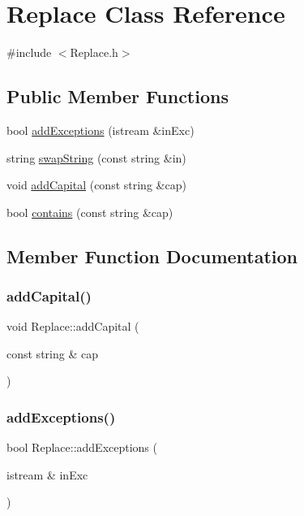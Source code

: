 \hypertarget{class_replace}{}\section{Replace Class Reference}
\label{class_replace}


{\ttfamily \#include $<$Replace.\+h$>$}

\subsection*{Public Member Functions}
\begin{DoxyCompactItemize}
\item 
bool \hyperlink{class_replace_a62e46b485d0fed42ad0b445673a75f84}{add\+Exceptions} (istream \&in\+Exc)
\item 
string \hyperlink{class_replace_a464d1037d9780790052685f2e30c58c0}{swap\+String} (const string \&in)
\item 
void \hyperlink{class_replace_a8ae8d231b3375eaaae29858da87319ec}{add\+Capital} (const string \&cap)
\item 
bool \hyperlink{class_replace_abcd8feb318330bd5eef71fcc287f31dc}{contains} (const string \&cap)
\end{DoxyCompactItemize}


\subsection{Member Function Documentation}
\mbox{\label{class_replace_a8ae8d231b3375eaaae29858da87319ec}} 
\subsubsection{\texorpdfstring{add\+Capital()}{addCapital()}}
{\footnotesize\ttfamily void Replace\+::add\+Capital (\begin{DoxyParamCaption}\item[{const string \&}]{cap }\end{DoxyParamCaption})}

\mbox{\label{class_replace_a62e46b485d0fed42ad0b445673a75f84}} 
\subsubsection{\texorpdfstring{add\+Exceptions()}{addExceptions()}}
{\footnotesize\ttfamily bool Replace\+::add\+Exceptions (\begin{DoxyParamCaption}\item[{istream \&}]{in\+Exc }\end{DoxyParamCaption})}

